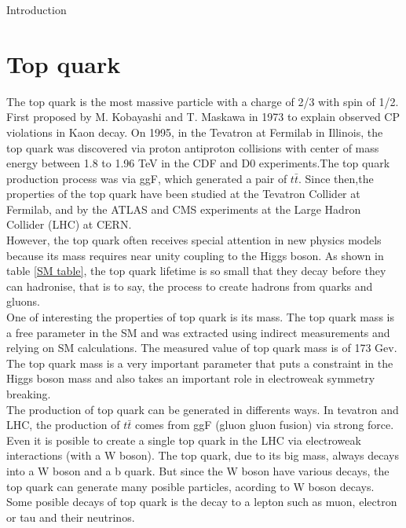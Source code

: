 \begin{chapter}{Introduction}
\pagebreak

\section{Top quark}
The top quark is the most massive particle with a charge of 2/3 with spin of 1/2. First proposed by M. Kobayashi and T. Maskawa in 1973 to explain observed CP violations in Kaon decay\cite{griff}. On 1995, in the Tevatron at Fermilab in Illinois, the top quark was discovered via proton antiproton collisions with center of mass energy between 1.8 to 1.96 TeV in the CDF and D0 experiments.The top quark production process was via ggF, which generated a pair of $t\bar{t}$\cite{top}.
Since then,the properties of the top quark have been studied at the Tevatron Collider at Fermilab, and by the ATLAS and CMS experiments at the Large Hadron Collider (LHC) at CERN.\\
However, the top quark often receives special attention in new physics models because its mass requires near unity coupling to the Higgs boson\cite{top}.
As shown in table \ref{SM table}, the top quark lifetime is so small that they decay before they can hadronise, that is to say, the process to create hadrons from quarks and gluons.\\

One of interesting the properties of top quark is its mass.
The top quark mass is a free parameter in the SM and was extracted using indirect measurements and relying on SM calculations. The measured value of top quark mass is of 173 Gev\cite{pd}.
The top quark mass is a very important
parameter that puts a constraint in the Higgs boson mass and also takes an important role in electroweak symmetry breaking\cite{top}.\\

The production of top quark can be generated in differents ways. In tevatron and LHC, the production of $t\bar{t}$ comes from ggF (gluon gluon fusion) via strong force. Even it is posible to create a single top quark in the LHC via electroweak interactions (with a W boson)\cite{th1}. 
The top quark, due to its big mass, always decays into a W boson and a b quark. But since the W boson have various decays, the top quark can generate many posible particles, acording to W boson decays. Some posible decays of top quark is the decay to a lepton such as muon, electron or tau and their neutrinos. %


\end{chapter}
